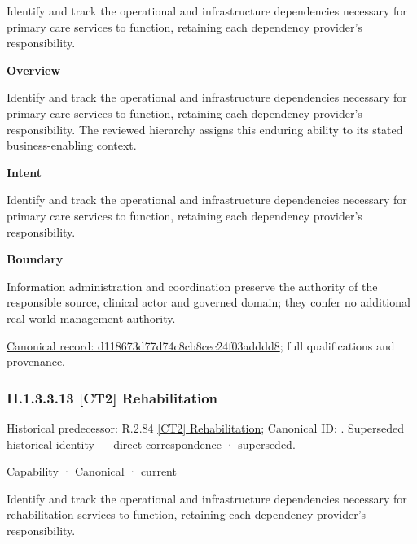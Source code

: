 Identify and track the operational and infrastructure dependencies necessary for primary care services to function, retaining each dependency provider's responsibility.



\textbf{Overview}



Identify and track the operational and infrastructure dependencies necessary for primary care services to function, retaining each dependency provider's responsibility. The reviewed hierarchy assigns this enduring ability to its stated business-enabling context.



\textbf{Intent}



Identify and track the operational and infrastructure dependencies necessary for primary care services to function, retaining each dependency provider's responsibility.



\textbf{Boundary}



Information administration and coordination preserve the authority of the responsible source, clinical actor and governed domain; they confer no additional real-world management authority.


{\footnotesize \href{../../../../continuum/strategy/capability/d118673d77d74c8cb8cec24f03adddd8.md}{Canonical record: d118673d77d74c8cb8cec24f03adddd8}; full qualifications and provenance.}\par
\subsubsection*{II.1.3.3.13 [CT2] Rehabilitation}
\label{navigation:II.1.3.3.13}

{\small Historical predecessor: R.2.84 \hyperref[element:28ec21d5918a49aaac12740c69f42d77]{[CT2] Rehabilitation}; Canonical ID: \texttt{}. Superseded historical identity — direct correspondence · superseded.}\par
\label{element:99ed51abcc5e4e8ba3b3d0161b17544a}
{\small Capability · Canonical · current}\par

Identify and track the operational and infrastructure dependencies necessary for rehabilitation services to function, retaining each dependency provider's responsibility.




